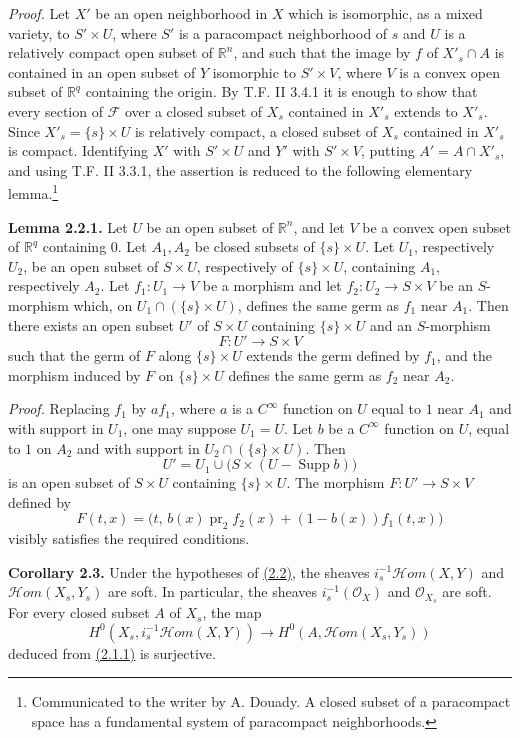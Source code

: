 \emph{Proof.} Let $X'$ be an open neighborhood in $X$ which is isomorphic, as a mixed variety, to $S'\times U$, where $S'$ is a paracompact neighborhood of $s$ and $U$ is a relatively compact open subset of $\mathbb R^n$, and such that the image by $f$ of $X'_s\cap A$ is contained in an open subset of $Y$ isomorphic to $S'\times V$, where $V$ is a convex open subset of $\mathbb R^q$ containing the origin. By T.F. II 3.4.1 it is enough to show that every section of $\mathcal F$ over a closed subset of $X_s$ contained in $X'_s$ extends to $X'_s$. Since $X'_s=\{s\}\times U$ is relatively compact, a closed subset of $X_s$ contained in $X'_s$ is compact. Identifying $X'$ with $S'\times U$ and $Y'$ with $S'\times V$, putting $A'=A\cap X'_s$, and using T.F. II 3.3.1, the assertion is reduced to the following elementary lemma.\footnote{Communicated to the writer by A. Douady. A closed subset of a paracompact space has a fundamental system of paracompact neighborhoods.}

\textbf{Lemma 2.2.1.} Let $U$ be an open subset of $\mathbb R^n$, and let $V$ be a convex open subset of $\mathbb R^q$ containing $0$. Let $A_1,A_2$ be closed subsets of $\{s\}\times U$. Let $U_1$, respectively $U_2$, be an open subset of $S\times U$, respectively of $\{s\}\times U$, containing $A_1$, respectively $A_2$. Let $f_1:U_1\to V$ be a morphism and let $f_2:U_2\to S\times V$ be an $S$-morphism which, on $U_1\cap(\{s\}\times U)$, defines the same germ as $f_1$ near $A_1$. Then there exists an open subset $U'$ of $S\times U$ containing $\{s\}\times U$ and an $S$-morphism
\[
 F:U'\longrightarrow S\times V
\]
such that the germ of $F$ along $\{s\}\times U$ extends the germ defined by $f_1$, and the morphism induced by $F$ on $\{s\}\times U$ defines the same germ as $f_2$ near $A_2$.

\emph{Proof.} Replacing $f_1$ by $af_1$, where $a$ is a $C^\infty$ function on $U$ equal to $1$ near $A_1$ and with support in $U_1$, one may suppose $U_1=U$. Let $b$ be a $C^\infty$ function on $U$, equal to $1$ on $A_2$ and with support in $U_2\cap(\{s\}\times U)$. Then
\[
 U' = U_1\cup\bigl(S\times (U-\operatorname{Supp}b)\bigr)
\]
is an open subset of $S\times U$ containing $\{s\}\times U$. The morphism $F:U'\to S\times V$ defined by
\[
 F(t,x)=\bigl(t,\,b(x)\operatorname{pr}_2 f_2(x)+(1-b(x))f_1(t,x)\bigr)
\]
visibly satisfies the required conditions.

\textbf{Corollary 2.3.} Under the hypotheses of \hyperlink{sga6.e02.prop.2-2}{(2.2)}, the sheaves $i_s^{-1}\mathcal Hom(X,Y)$ and $\mathcal Hom(X_s,Y_s)$ are soft. In particular, the sheaves $i_s^{-1}(\mathcal O_X)$ and $\mathcal O_{X_s}$ are soft. For every closed subset $A$ of $X_s$, the map
\[
 H^0(X_s,i_s^{-1}\mathcal Hom(X,Y))\longrightarrow H^0(A,\mathcal Hom(X_s,Y_s))
\]
deduced from \hyperlink{sga6.e02.eq.2-1-1}{(2.1.1)} is surjective.

